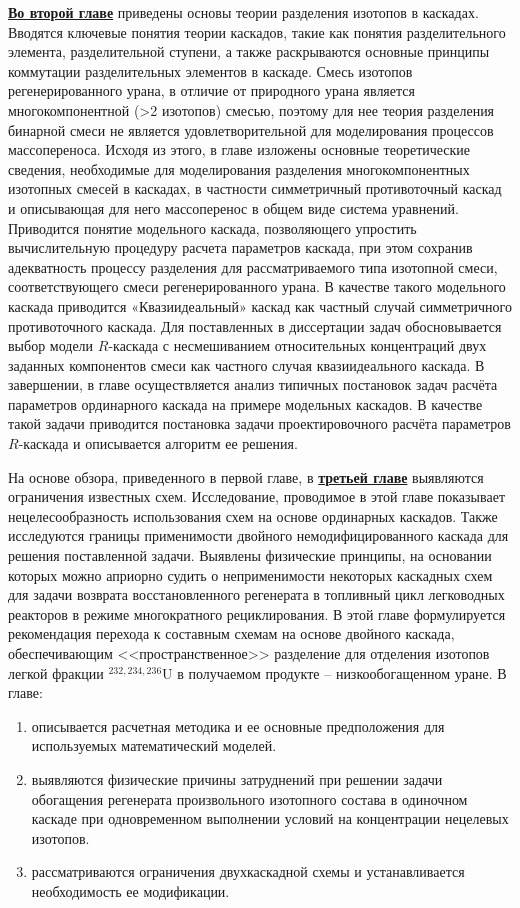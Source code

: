 \underline{\textbf{Во второй главе}} приведены основы теории разделения изотопов в каскадах. Вводятся ключевые понятия теории каскадов, такие как понятия разделительного элемента, разделительной ступени, а также раскрываются основные принципы коммутации разделительных элементов в каскаде. Смесь изотопов регенерированного урана, в отличие от природного урана является многокомпонентной (>2 изотопов) смесью, поэтому для нее теория разделения бинарной смеси не является удовлетворительной для моделирования процессов массопереноса. Исходя из этого, в главе изложены основные теоретические сведения, необходимые для моделирования разделения многокомпонентных изотопных смесей в каскадах, в частности симметричный противоточный каскад и описывающая для него массоперенос в общем виде система уравнений. Приводится понятие модельного каскада, позволяющего упростить вычислительную процедуру расчета параметров каскада, при этом сохранив адекватность процессу разделения для рассматриваемого типа изотопной смеси, соответствующего смеси регенерированного урана. В качестве такого модельного каскада приводится «Квазиидеальный» каскад как частный случай симметричного противоточного каскада. Для поставленных в диссертации задач обосновывается выбор модели $R$-каскада с несмешиванием относительных концентраций двух заданных компонентов смеси как частного случая квазиидеального каскада. В завершении, в главе осуществляется анализ типичных постановок задач расчёта параметров ординарного каскада на примере модельных каскадов. В качестве такой задачи приводится постановка задачи проектировочного расчёта параметров $R$-каскада и описывается алгоритм ее решения.

На основе обзора, приведенного в первой главе, в \underline{\textbf{третьей главе}} выявляются ограничения известных схем. Исследование, проводимое в этой главе показывает нецелесообразность использования схем на основе ординарных каскадов. Также исследуются границы применимости двойного немодифицированного каскада для решения поставленной задачи. Выявлены физические принципы, на основании которых можно априорно судить о неприменимости некоторых каскадных схем для задачи возврата восстановленного регенерата в топливный цикл легководных реакторов в режиме многократного рециклирования. В этой главе формулируется рекомендация перехода к составным схемам на основе двойного каскада, обеспечивающим <<пространственное>> разделение для отделения изотопов легкой фракции $^{232,234,236}$U в получаемом продукте -- низкообогащенном уране.
В главе:
\begin{enumerate}
  \item описывается расчетная методика и ее основные предположения для используемых математический моделей.
  \item выявляются физические причины затруднений при решении задачи обогащения регенерата произвольного изотопного состава в одиночном каскаде при одновременном выполнении условий на концентрации нецелевых изотопов.
  \item рассматриваются ограничения двухкаскадной схемы и устанавливается необходимость ее модификации.
\end{enumerate}


